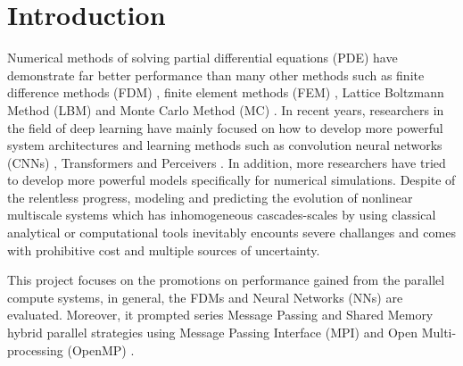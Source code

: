 \section{Introduction}
Numerical methods of solving partial differential equations (PDE) have 
demonstrate far better performance than many other methods such as finite 
difference methods (FDM) \cite{},
finite element methods (FEM) \cite{}, 
Lattice Boltzmann Method (LBM) \cite{}
and Monte Carlo Method (MC) \cite{}.
In recent years, researchers in the field of deep learning have mainly focused 
on how to develop more powerful system architectures and learning methods such 
as convolution neural networks (CNNs) \cite{}, 
Transformers \cite{} 
and Perceivers \cite{} .
In addition, more researchers have tried to develop more powerful models specifically 
for numerical simulations. 
Despite of the relentless progress, modeling and predicting the evolution of nonlinear 
multiscale systems which has inhomogeneous cascades-scales by using classical analytical 
or computational tools inevitably encounts severe challanges and comes with prohibitive
cost and multiple sources of uncertainty.

This project focuses on the promotions on performance gained from the parallel compute systems, 
in general, the FDMs and Neural Networks (NNs) are evaluated.
Moreover, it prompted series Message Passing and Shared Memory hybrid parallel strategies using 
Message Passing Interface (MPI) \cite{MPI}
and
Open Multi-processing (OpenMP) \cite{OpenMP}.